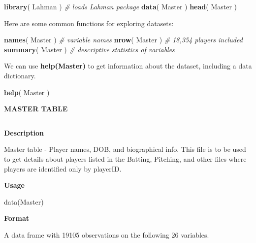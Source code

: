 \documentclass[]{book}
\newenvironment{Shaded}{\begin{snugshade}}{\end{snugshade}}
\newcommand{\CommentTok}[1]{\textcolor[rgb]{0.56,0.35,0.01}{\textit{#1}}}
\newcommand{\KeywordTok}[1]{\textcolor[rgb]{0.13,0.29,0.53}{\textbf{#1}}}
\newcommand{\NormalTok}[1]{#1}
\theoremstyle{definition}
\theoremstyle{definition}
\theoremstyle{definition}
\theoremstyle{remark}
\begin{document}
\begin{Shaded}
\begin{Highlighting}[]

\KeywordTok{library}\NormalTok{( Lahman )    }\CommentTok{# loads Lahman package}
\KeywordTok{data}\NormalTok{( Master )}
\KeywordTok{head}\NormalTok{( Master ) }
\end{Highlighting}
\end{Shaded}

Here are some common functions for exploring datasets:

\begin{Shaded}
\begin{Highlighting}[]
\KeywordTok{names}\NormalTok{( Master )      }\CommentTok{# variable names}
\KeywordTok{nrow}\NormalTok{( Master )       }\CommentTok{# 18,354 players included}
\KeywordTok{summary}\NormalTok{( Master )    }\CommentTok{# descriptive statistics of variables}
\end{Highlighting}
\end{Shaded}

We can use \textbf{help(Master)} to get information about the dataset,
including a data dictionary.

\begin{Shaded}
\begin{Highlighting}[]

\KeywordTok{help}\NormalTok{( Master )}
\end{Highlighting}
\end{Shaded}

\textbf{MASTER TABLE}

\begin{center}\rule{0.5\linewidth}{\linethickness}\end{center}

\textbf{Description}

Master table - Player names, DOB, and biographical info. This file is to
be used to get details about players listed in the Batting, Pitching,
and other files where players are identified only by playerID.

\textbf{Usage}

data(Master)

\textbf{Format}

A data frame with 19105 observations on the following 26 variables.
\end{document}

